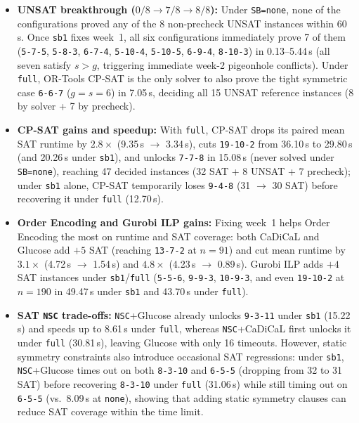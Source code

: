 \documentclass[a4paper,fleqn]{cas-sc}
\begin{document}
\begin{itemize}[noitemsep]
    \item \textbf{UNSAT breakthrough ($0/8 \to 7/8 \to 8/8$):} Under \texttt{SB=none}, none of the configurations proved any of the 8 non-precheck UNSAT instances within 60\,s. Once \texttt{sb1} fixes week~1, all six configurations immediately prove 7 of them (\texttt{5-7-5}, \texttt{5-8-3}, \texttt{6-7-4}, \texttt{5-10-4}, \texttt{5-10-5}, \texttt{6-9-4}, \texttt{8-10-3}) in 0.13--5.44\,s (all seven satisfy $s > g$, triggering immediate week-2 pigeonhole conflicts). Under \texttt{full}, OR-Tools CP-SAT is the only solver to also prove the tight symmetric case \texttt{6-6-7} ($g=s=6$) in 7.05\,s, deciding all 15 UNSAT reference instances (8 by solver + 7 by precheck).
    \item \textbf{CP-SAT gains and speedup:} With \texttt{full}, CP-SAT drops its paired mean SAT runtime by $2.8\times$ (9.35\,s $\to$ 3.34\,s), cuts \texttt{19-10-2} from 36.10\,s to 29.80\,s (and 20.26\,s under \texttt{sb1}), and unlocks \texttt{7-7-8} in 15.08\,s (never solved under \texttt{SB=none}), reaching 47 decided instances (32 SAT + 8 UNSAT + 7 precheck); under \texttt{sb1} alone, CP-SAT temporarily loses \texttt{9-4-8} (31 $\to$ 30 SAT) before recovering it under \texttt{full} (12.70\,s).
    \item \textbf{Order Encoding and Gurobi ILP gains:} Fixing week~1 helps Order Encoding the most on runtime and SAT coverage: both CaDiCaL and Glucose add $+5$ SAT (reaching \texttt{13-7-2} at $n=91$) and cut mean runtime by $3.1\times$ (4.72\,s $\to$ 1.54\,s) and $4.8\times$ (4.23\,s $\to$ 0.89\,s). Gurobi ILP adds $+4$ SAT instances under \texttt{sb1}/\texttt{full} (\texttt{5-5-6}, \texttt{9-9-3}, \texttt{10-9-3}, and even \texttt{19-10-2} at $n=190$ in 49.47\,s under \texttt{sb1} and 43.70\,s under \texttt{full}).
    \item \textbf{SAT \texttt{NSC} trade-offs:} \texttt{NSC}+Glucose already unlocks \texttt{9-3-11} under \texttt{sb1} (15.22\,s) and speeds up to 8.61\,s under \texttt{full}, whereas \texttt{NSC}+CaDiCaL first unlocks it under \texttt{full} (30.81\,s), leaving Glucose with only 16 timeouts. However, static symmetry constraints also introduce occasional SAT regressions: under \texttt{sb1}, \texttt{NSC}+Glucose times out on both \texttt{8-3-10} and \texttt{6-5-5} (dropping from 32 to 31 SAT) before recovering \texttt{8-3-10} under \texttt{full} (31.06\,s) while still timing out on \texttt{6-5-5} (vs.\ 8.09\,s at \texttt{none}), showing that adding static symmetry clauses can reduce SAT coverage within the time limit.
\end{itemize}
\end{document}
